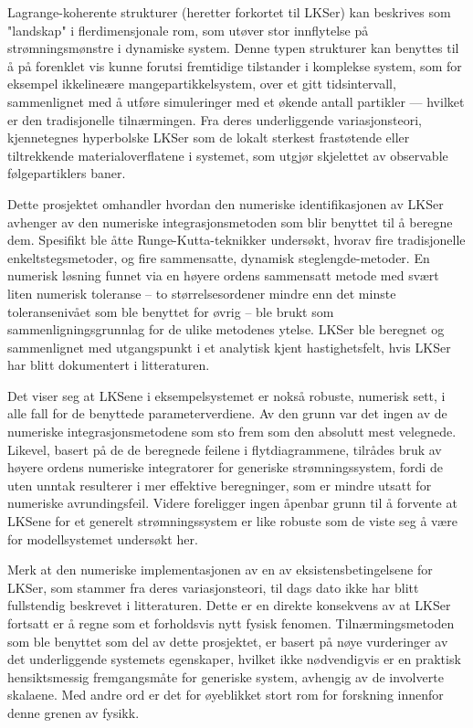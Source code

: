 Lagrange-koherente strukturer (heretter forkortet til LKSer) kan beskrives som
"landskap" i flerdimensjonale rom, som utøver stor innflytelse på
strømningsmønstre i dynamiske system. Denne typen strukturer kan benyttes til
å på forenklet vis kunne forutsi fremtidige tilstander i komplekse system, som
for eksempel ikkelineære mangepartikkelsystem, over et gitt tidsintervall,
sammenlignet med å utføre simuleringer med et økende antall partikler ---
hvilket er den tradisjonelle tilnærmingen. Fra deres underliggende
variasjonsteori, kjennetegnes hyperbolske LKSer som de lokalt sterkest
frastøtende eller tiltrekkende materialoverflatene i systemet, som utgjør
skjelettet av observable følgepartiklers baner.

Dette prosjektet omhandler hvordan den numeriske identifikasjonen av LKSer
avhenger av den numeriske integrasjonsmetoden som blir benyttet til å beregne
dem. Spesifikt ble åtte Runge-Kutta-teknikker undersøkt, hvorav fire
tradisjonelle enkeltstegsmetoder, og fire sammensatte,
dynamisk steglengde-metoder. En numerisk løsning funnet via en høyere
ordens sammensatt metode med svært liten numerisk toleranse -- to
størrelsesordener mindre enn det minste toleransenivået som ble benyttet for
øvrig -- ble brukt som sammenligningsgrunnlag for de ulike metodenes ytelse.
LKSer ble beregnet og sammenlignet med utgangspunkt i et analytisk kjent
hastighetsfelt, hvis LKSer har blitt dokumentert i litteraturen.

Det viser seg at LKSene i eksempelsystemet er nokså robuste, numerisk sett,
i alle fall for de benyttede parameterverdiene. Av den grunn var det ingen
av de numeriske integrasjonsmetodene som sto frem som den absolutt mest
velegnede. Likevel, basert på de de beregnede feilene i flytdiagrammene,
tilrådes bruk av høyere ordens numeriske integratorer for generiske
strømningssystem, fordi de uten unntak resulterer i mer effektive beregninger,
som er mindre utsatt for numeriske avrundingsfeil. Videre foreligger ingen
åpenbar grunn til å forvente at LKSene for et generelt strømningssystem er like
robuste som de viste seg å være for modellsystemet undersøkt her.

Merk at den numeriske implementasjonen av en av eksistensbetingelsene for
LKSer, som stammer fra deres variasjonsteori, til dags dato ikke har blitt
fullstendig beskrevet i litteraturen. Dette er en direkte konsekvens
av at LKSer fortsatt er å regne som et forholdsvis nytt fysisk fenomen.
Tilnærmingsmetoden som ble benyttet som del av dette prosjektet, er basert
på nøye vurderinger av det underliggende systemets egenskaper, hvilket
ikke nødvendigvis er en praktisk hensiktsmessig fremgangsmåte for generiske
system, avhengig av de involverte skalaene. Med andre ord er det for øyeblikket
stort rom for forskning innenfor denne grenen av fysikk.

